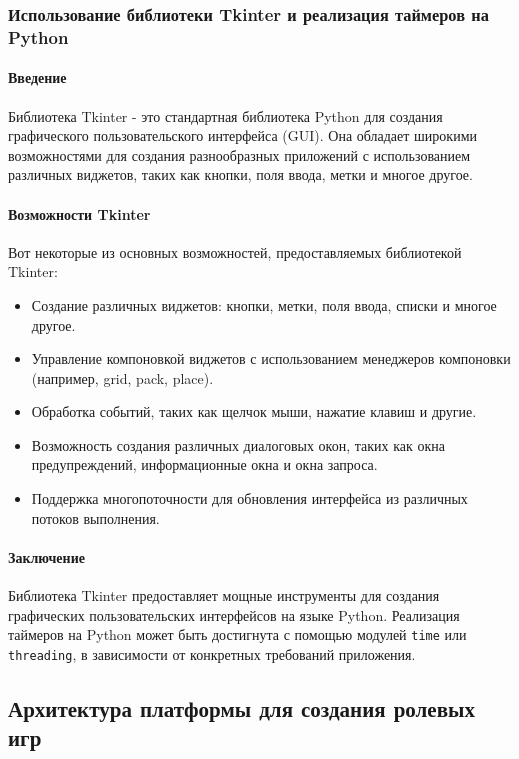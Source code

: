 \subsubsection{Использование библиотеки Tkinter и реализация таймеров на Python}
	
\paragraph{Введение}
Библиотека Tkinter - это стандартная библиотека Python для создания графического пользовательского интерфейса (GUI). Она обладает широкими возможностями для создания разнообразных приложений с использованием различных виджетов, таких как кнопки, поля ввода, метки и многое другое.
	
\paragraph{Возможности Tkinter}
Вот некоторые из основных возможностей, предоставляемых библиотекой Tkinter:
	
\begin{itemize}
	\item Создание различных виджетов: кнопки, метки, поля ввода, списки и многое другое.
	\item Управление компоновкой виджетов с использованием менеджеров компоновки (например, grid, pack, place).
	\item Обработка событий, таких как щелчок мыши, нажатие клавиш и другие.
	\item Возможность создания различных диалоговых окон, таких как окна предупреждений, информационные окна и окна запроса.
	\item Поддержка многопоточности для обновления интерфейса из различных потоков выполнения.
\end{itemize}
	
\paragraph{Заключение}
Библиотека Tkinter предоставляет мощные инструменты для создания графических пользовательских интерфейсов на языке Python. Реализация таймеров на Python может быть достигнута с помощью модулей \texttt{time} или \texttt{threading}, в зависимости от конкретных требований приложения.

\subsection{Архитектура платформы для создания ролевых игр}
